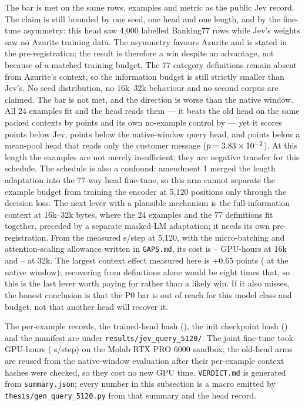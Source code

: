 \ifnum{}
  The bar is met on the same rows, examples and metric as the public Jev record.
  The claim is still bounded by one seed, one head and one length, and by the
  fine-tune asymmetry: this head saw 4{,}000 labelled Banking77 rows while Jev's
  weights saw no Azurite training data. The asymmetry favours Azurite and is
  stated in the pre-registration; the result is therefore a win despite an
  advantage, not because of a matched training budget. The 77 category
  definitions remain absent from Azurite's context, so the information budget
  is still strictly smaller than Jev's. No seed distribution, no 16k--32k
  behaviour and no second corpus are claimed.
\else
  The bar is not met, and the direction is worse than the native window. All 24
  examples fit and the head reads them --- it beats the old head on the same
  packed contexts by \LenMechGain{} points and its own no-example control by
  \LenVsLenZeroGain{} --- yet it scores \LenDiffAbs{} points below Jev,
  \LenNativeGapAbs{} points below the native-window query head, and
  \LenVsOldZeroAbs{} points below a mean-pool head that reads only the customer
  message ($p = 3.83\times10^{-2}$). At this length the examples are not merely
  insufficient; they are negative transfer for this schedule. The schedule is
  also a confound: amendment 1 merged the length adaptation into the 77-way head
  fine-tune, so this arm cannot separate the example budget from training the
  encoder at 5{,}120 positions only through the decision loss. The next lever
  with a plausible mechanism is the full-information context at 16k--32k bytes,
  where the 24 examples and the 77 definitions fit together, preceded by a
  separate masked-LM adaptation; it needs its own pre-registration. From the
  measured \LenSecStep{} s/step at 5{,}120, with the micro-batching and
  attention-scaling allowance written in \texttt{GAPS.md}, its cost is
  \LenNextShortLo--\LenNextShortHi{} GPU-hours at 16k and
  \LenNextLongLo--\LenNextLongHi{} at 32k. The largest context effect measured
  here is +0.65 points (\QueryVsOldZeroGain{} at the native window); recovering
  \LenDiffAbs{} from definitions alone would be eight times that, so this is the
  last lever worth paying for rather than a likely win. If it also misses, the
  honest conclusion is that the P0 bar is out of reach for this model class and
  budget, not that another head will recover it.
\fi

The per-example records, the trained-head hash (\texttt{\LenHeadSha}), the init
checkpoint hash (\texttt{\LenInitSha}) and the manifest are under
\texttt{results/jev\_query\_5120/}. The joint fine-tune took \LenHeadHours{}
GPU-hours (\LenSecStep{} s/step) on the Molab RTX PRO 6000 sandbox; the old-head
arms are reused from the native-window evaluation after their per-example
context hashes were checked, so they cost no new GPU time.
\texttt{VERDICT.md} is generated from \texttt{summary.json}; every number in
this subsection is a macro emitted by \texttt{thesis/gen\_query\_5120.py} from
that summary and the head record.

